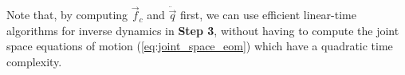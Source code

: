 \documentclass{llncs}
\newcommand{\vf}{\vec{f}}
\newcommand{\vddq} {\ddot{\vec{q}}}
\begin{document}
Note that, by computing $\vf_c$ and $\vddq$ first,
we can use efficient linear-time algorithms for inverse dynamics in {\bf Step 3},
without having to compute the joint space equations of motion (\ref{eq:joint_space_eom})
which have a quadratic time complexity.







\end{document}

